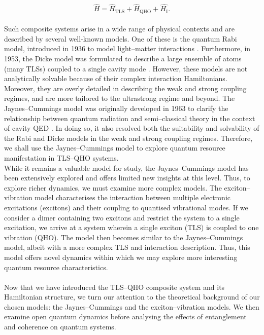 \documentclass[11pt]{article}
\begin{document}
\begin{equation}
    \hat{H} = \hat{H}_{\scriptscriptstyle \text{TLS}} + \hat{H}_{\scriptscriptstyle \text{QHO}} + \hat{H_{\scriptscriptstyle \text{I}}}.
\end{equation}
\\
Such composite systems arise in a wide range of physical contexts and are described by several well-known models. One of these is the quantum Rabi model, introduced in 1936 to model light--matter interactions \cite{Context1936-Rabi}. Furthermore, in 1953, the Dicke model was formulated to describe a large ensemble of atoms (many TLSs) coupled to a single cavity mode \cite{Context1954-Dicke}. However, these models are not analytically solvable because of their complex interaction Hamiltonians. Moreover, they are overly detailed in describing the weak and strong coupling regimes, and are more tailored to the ultrastrong regime and beyond. The Jaynes--Cummings model was originally developed in 1963 to clarify the relationship between quantum radiation and semi--classical theory in the context of cavity QED \cite{Context1963-JC_Original}. In doing so, it also resolved both the suitability and solvability of the Rabi and Dicke models in the weak and strong coupling regimes. Therefore, we shall use the Jaynes--Cummings model to explore quantum resource manifestation in TLS--QHO systems.\\
While it remains a valuable model for study, the Jaynes--Cummings model has been extensively explored and offers limited new insights at this level. Thus, to explore richer dynamics, we must examine more complex models. The exciton--vibration model characterises the interaction between multiple electronic excitations (excitons) and their coupling to quantised vibrational modes. If we consider a dimer containing two excitons and restrict the system to a single excitation, we arrive at a system wherein a single exciton (TLS) is coupled to one vibration (QHO). The model then becomes similar to the Jaynes--Cummings model, albeit with a more complex TLS and interaction description. Thus, this model offers novel dynamics within which we may explore more interesting quantum resource characteristics. \\
\\
Now that we have introduced the TLS–QHO composite system and its Hamiltonian structure, we turn our attention to the theoretical background of our chosen models: the Jaynes–Cummings and the exciton–vibration models. We then examine open quantum dynamics before analysing the effects of entanglement and coherence on quantum systems.
\end{document}
